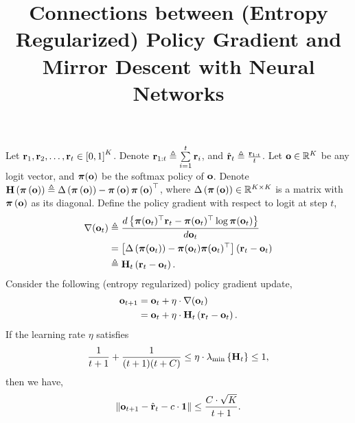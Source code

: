 \documentclass[10pt]{article}
\title{Connections between (Entropy Regularized) Policy Gradient and Mirror Descent with Neural Networks}
\author{}
\date{}
\begin{document}
\maketitle


\begin{lem}
Let ${\mathbf{r}}_1, {\mathbf{r}}_2, \dots, {\mathbf{r}}_t \in \left[ 0, 1  \right]^K$. Denote ${\mathbf{r}}_{1:t} \triangleq \sum\limits_{i=1}^{t}{{\mathbf{r}}_i}$, and $\hat{{\mathbf{r}}}_t \triangleq \frac{{\mathbf{r}}_{1:t}}{t}$. Let ${\mathbf{o}} \in {\mathbb{R}}^K$ be any logit vector, and ${\boldsymbol{\pi}}({\mathbf{o}})$ be the softmax policy of ${\mathbf{o}}$. Denote ${\mathbf{H}}\left( {\boldsymbol{\pi}} \left({\mathbf{o}} \right) \right) \triangleq \Delta \left( {\boldsymbol{\pi}} \left({\mathbf{o}} \right) \right) - {\boldsymbol{\pi}} \left({\mathbf{o}} \right) {\boldsymbol{\pi}} \left({\mathbf{o}} \right)^\top$, where $\Delta \left( {\boldsymbol{\pi}} \left({\mathbf{o}} \right) \right) \in {\mathbb{R}}^{K \times K}$ is a matrix with ${\boldsymbol{\pi}} \left({\mathbf{o}} \right)$ as its diagonal. Define the policy gradient with respect to logit at step $t$,
\begin{equation*}
\begin{split}
    \nabla({\mathbf{o}}_t) &\triangleq \frac{d \left\{ {\boldsymbol{\pi}}({\mathbf{o}}_t)^\top {\mathbf{r}}_t - {\boldsymbol{\pi}}({\mathbf{o}}_t)^\top \log{{\boldsymbol{\pi}}({\mathbf{o}}_t)} \right\} }{d {\mathbf{o}}_t} \\
    &= \left[ \Delta \left( {\boldsymbol{\pi}}({\mathbf{o}}_t) \right) - {\boldsymbol{\pi}}({\mathbf{o}}_t) {\boldsymbol{\pi}}({\mathbf{o}}_t)^\top \right] \left( {\mathbf{r}}_t - {\mathbf{o}}_t \right) \\
    &\triangleq {\mathbf{H}}_t \left( {\mathbf{r}}_t - {\mathbf{o}}_t \right).
\end{split}
\end{equation*}
Consider the following (entropy regularized) policy gradient update,
\begin{equation*}
\begin{split}
    {\mathbf{o}}_{t+1} &= {\mathbf{o}}_t + \eta \cdot \nabla({\mathbf{o}}_t) \\
    &= {\mathbf{o}}_t + \eta \cdot {\mathbf{H}}_t \left( {\mathbf{r}}_t - {\mathbf{o}}_t \right).
\end{split}
\end{equation*}
If the learning rate $\eta$ satisfies
\begin{equation*}
    \frac{1}{t+1} + \frac{1}{(t+1)(t+C)} \le \eta \cdot \lambda_{\min}\left\{ {\mathbf{H}}_t \right\} \le 1,
\end{equation*}
then we have,
\begin{equation*}
    \left\| {\mathbf{o}}_{t+1} - \hat{{\mathbf{r}}}_{t} - c \cdot {\mathbf{1}} \right\| \le \frac{C \cdot \sqrt{K}}{t+1}.
\end{equation*}
\end{lem}
\end{document}
